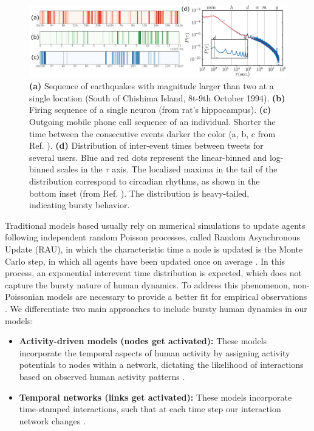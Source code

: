 \begin{figure}
    \centering
    \captionsetup{font=sf}
    \includegraphics[width=\textwidth]{Figs/Introduction/bursty.png}
    \caption[Bursty human dynamics: examples and distribution]{\textbf{(a)} Sequence of earthquakes with magnitude larger than two at a single location (South of Chishima Island, 8t-9th October 1994). \textbf{(b)} Firing sequence of a single neuron (from rat's hippocampus). \textbf{(c)} Outgoing mobile phone call sequence of an individual. Shorter the time between the consecutive events darker the color (a, b, c from Ref. \cite{karsai2012universal}). \textbf{(d)} Distribution of inter-event times between tweets for several users. Blue and red dots represent the linear-binned and log-binned scales in the $\tau$ axis. The localized maxima in the tail of the distribution correspond to circadian rhythms, as shown in the bottom inset  (from Ref. \cite{artime-2017}). The distribution is heavy-tailed, indicating bursty behavior.}
    \label{fig:bursty_human_dynamics}
\end{figure}

Traditional models based usually rely on numerical simulations to update agents following independent random Poisson processes, called Random Asynchronous Update (RAU), in which the characteristic time a node is updated is the Monte Carlo step, in which all agents have been updated once on average \cite{fernandez-gracia-2011}. In this process, an exponential interevent time distribution is expected, which does not capture the bursty nature of human dynamics. To address this phenomenon, non-Poissonian models are necessary to provide a better fit for empirical observations \cite{Vazquez2006Bursts}. We differentiate two main approaches to include bursty human dynamics in our models:

\begin{itemize}
    \item \textbf{Activity-driven models (nodes get activated):} These models incorporate the temporal aspects of human activity by assigning activity potentials to nodes within a network, dictating the likelihood of interactions based on observed human activity patterns \cite{stark-2008,van-mieghem-2013,starnini-2017}.
    \item \textbf{Temporal networks (links get activated):} These models incorporate time-stamped interactions, such that at each time step our interaction network changes \cite{Holme2012Temporal, Perra2012ActivityDriven}.
\end{itemize}

